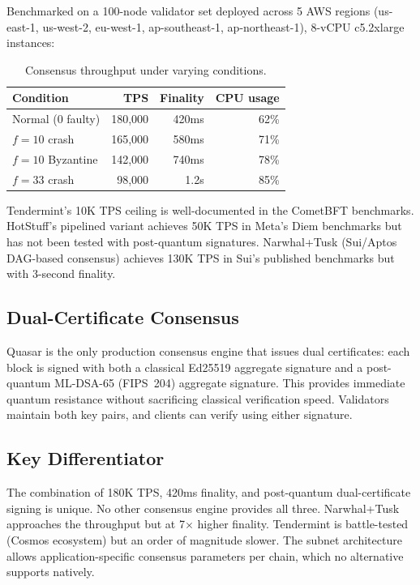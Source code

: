 Benchmarked on a 100-node validator set deployed across 5 AWS regions (us-east-1, us-west-2, eu-west-1, ap-southeast-1, ap-northeast-1), 8-vCPU c5.2xlarge instances:

\begin{table}[H]
\centering
\caption{Consensus throughput under varying conditions.}
\footnotesize
\begin{tabular}{@{}lrrr@{}}
\toprule
Condition & TPS & Finality & CPU usage \\
\midrule
Normal (0 faulty) & 180,000 & 420ms & 62\% \\
$f = 10$ crash & 165,000 & 580ms & 71\% \\
$f = 10$ Byzantine & 142,000 & 740ms & 78\% \\
$f = 33$ crash & 98,000 & 1.2s & 85\% \\
\bottomrule
\end{tabular}
\end{table}

Tendermint's 10K TPS ceiling is well-documented in the CometBFT benchmarks. HotStuff's pipelined variant achieves 50K TPS in Meta's Diem benchmarks but has not been tested with post-quantum signatures. Narwhal+Tusk (Sui/Aptos DAG-based consensus) achieves 130K TPS in Sui's published benchmarks but with 3-second finality.

\subsection{Dual-Certificate Consensus}

Quasar is the only production consensus engine that issues dual certificates: each block is signed with both a classical Ed25519 aggregate signature and a post-quantum ML-DSA-65 (FIPS~204) aggregate signature. This provides immediate quantum resistance without sacrificing classical verification speed. Validators maintain both key pairs, and clients can verify using either signature.

\subsection{Key Differentiator}

The combination of 180K TPS, 420ms finality, and post-quantum dual-certificate signing is unique. No other consensus engine provides all three. Narwhal+Tusk approaches the throughput but at 7$\times$ higher finality. Tendermint is battle-tested (Cosmos ecosystem) but an order of magnitude slower. The subnet architecture allows application-specific consensus parameters per chain, which no alternative supports natively.

